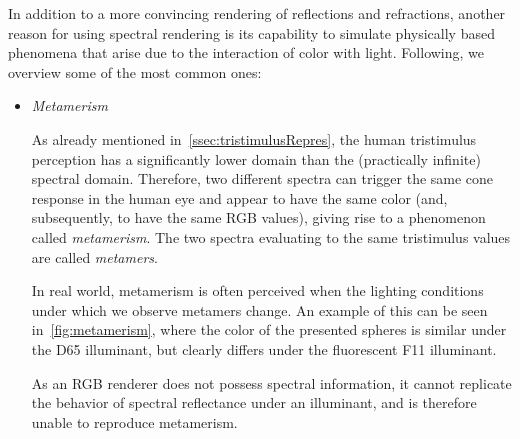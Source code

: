 In addition to a more convincing rendering of reflections and refractions, another reason for using spectral rendering is its capability to simulate physically based phenomena that arise due to the interaction of color with light. Following, we overview some of the most common ones:
\begin{itemize}
\item \emph{Metamerism} \label{item:metamerism}

As already mentioned in~\cref{ssec:tristimulusRepres}, the human tristimulus perception has a significantly lower domain than the (practically infinite) spectral domain. Therefore, two different spectra can trigger the same cone response in the human eye and appear to have the same color (and, subsequently, to have the same RGB values), giving rise to a phenomenon called \emph{metamerism}. The two spectra evaluating to the same tristimulus values are called \emph{metamers}.

In real world, metamerism is often perceived when the lighting conditions under which we observe metamers change. An example of this can be seen in~\cref{fig:metamerism}, where the color of the presented spheres is similar under the D65 illuminant, but clearly differs under the fluorescent F11 illuminant.

As an RGB renderer does not possess spectral information, it cannot replicate the behavior of spectral reflectance under an illuminant, and is therefore unable to reproduce metamerism.


\end{itemize}
